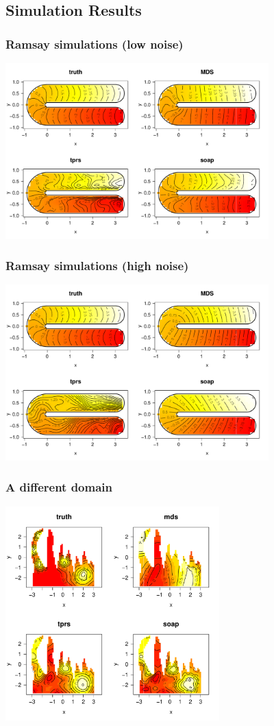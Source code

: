 \documentclass[ignorenonframetext]{beamer} %
\begin{document}
\subsection{Simulation Results}

\begin{frame}
	\frametitle{Ramsay simulations (low noise)}
            \centering
              \includegraphics[width=4in]{figs/ramsay-low.pdf}\\
\end{frame}

\begin{frame}
	\frametitle{Ramsay simulations (high noise)}
            \centering
              \includegraphics[width=4in]{figs/ramsay-high.pdf}\\
\end{frame}

\begin{frame}
	\frametitle{A different domain}
            \centering
              \includegraphics[width=3.25in]{figs/wt2-real.pdf}\\
\end{frame}
\end{document}
